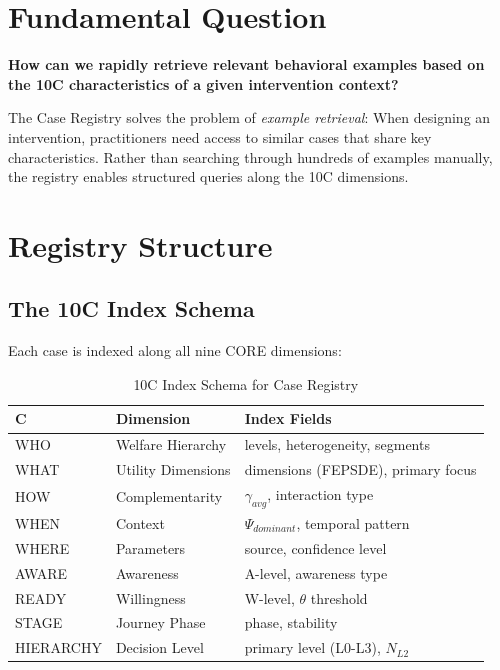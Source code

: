 \section{Fundamental Question}

\begin{tcolorbox}[colback=blue!5, colframe=blue!50, title=Central Question]
\textbf{How can we rapidly retrieve relevant behavioral examples based on the 10C characteristics of a given intervention context?}
\end{tcolorbox}

The Case Registry solves the problem of \textit{example retrieval}: When designing an intervention, practitioners need access to similar cases that share key characteristics. Rather than searching through hundreds of examples manually, the registry enables structured queries along the 10C dimensions.

\section{Registry Structure}

\subsection{The 10C Index Schema}

Each case is indexed along all nine CORE dimensions:

\begin{table}[h]
\centering
\begin{tabular}{llp{6cm}}
\toprule
\textbf{C} & \textbf{Dimension} & \textbf{Index Fields} \\
\midrule
WHO & Welfare Hierarchy & levels, heterogeneity, segments \\
WHAT & Utility Dimensions & dimensions (FEPSDE), primary focus \\
HOW & Complementarity & $\gamma_{avg}$, interaction type \\
WHEN & Context & $\Psi_{dominant}$, temporal pattern \\
WHERE & Parameters & source, confidence level \\
AWARE & Awareness & A-level, awareness type \\
READY & Willingness & W-level, $\theta$ threshold \\
STAGE & Journey Phase & phase, stability \\
HIERARCHY & Decision Level & primary level (L0-L3), $N_{L2}$ \\
\bottomrule
\end{tabular}
\caption{10C Index Schema for Case Registry}
\end{table}

